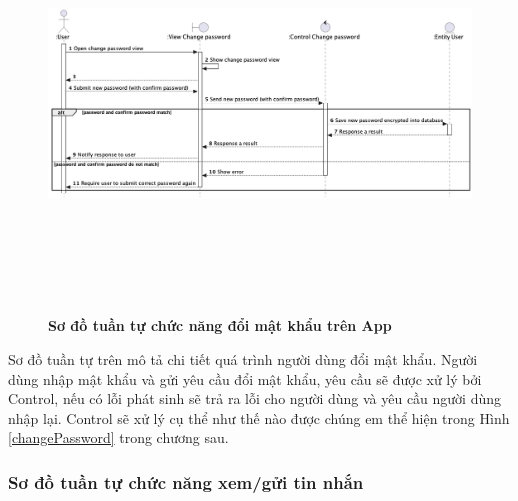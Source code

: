   \begin{figure}[H]
        \centering
        \includegraphics[width=16cm,height=11cm]{Images/mobile_app/change_password.png}
        \caption[Sơ đồ tuần tự chức năng đổi mật khẩu trên App]{\bfseries \fontsize{12pt}{0pt}
        \selectfont Sơ đồ tuần tự chức năng đổi mật khẩu trên App}
        \label{change_password} %
  \end{figure}

  Sơ đồ tuần tự trên mô tả chi tiết quá trình người dùng đổi mật khẩu. Người dùng nhập mật khẩu và gửi yêu cầu đổi mật khẩu, 
  yêu cầu sẽ được xử lý bởi Control, nếu có lỗi phát sinh sẽ trả ra lỗi cho người dùng và yêu cầu người dùng nhập lại. Control
  sẽ xử lý cụ thể như thế nào được chúng em thể hiện trong Hình \ref{changePassword} trong chương sau.

\subsubsection{Sơ đồ tuần tự chức năng xem/gửi tin nhắn}

